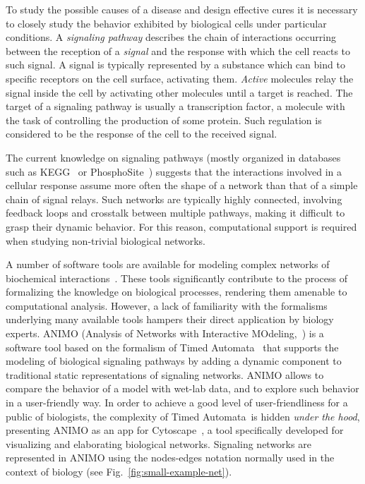 \documentclass{llncs}
\newcommand{\tas}{Timed Automata}
\begin{document}
To study the possible causes of a disease and design effective cures it is 
necessary to closely study the behavior exhibited by biological cells under particular conditions.
A \emph{signaling pathway} describes the chain of interactions occurring
between the reception of a \emph{signal} and the response with which the cell
reacts to such signal. 
A signal is typically represented by a substance which can bind
to specific receptors on the cell surface, activating them.
\emph{Active} molecules relay the signal inside the cell by activating
other molecules until a target is reached. The target of a signaling pathway is usually a transcription
factor, a molecule with the task of controlling the production of some protein. Such regulation is considered to be the response of the cell to the received signal.

The current knowledge on signaling pathways (mostly organized in databases such as KEGG~\cite{kegg}
or PhosphoSite~\cite{phosphosite}) suggests that the interactions involved in a cellular response assume more often
the shape of a network than that of a simple chain of signal relays.
Such networks are typically highly connected, involving feedback loops and crosstalk
between multiple pathways, making it difficult 
to grasp their dynamic behavior.
For this reason, computational support is required when studying non-trivial biological networks.

A number of software tools are available
for modeling complex networks of biochemical interactions~\cite{bio-pepa,blenx,copasi,e-cell,gna}.
These tools significantly contribute to the process of formalizing the knowledge on biological
processes, rendering them amenable to computational analysis.
However, a lack of familiarity with the formalisms underlying many available tools
hampers their direct application by biology experts.
ANIMO (Analysis of Networks with Interactive MOdeling,~\cite{animo-site,animo-ieee,animo-gene}) is a software tool
based on the formalism of \tas~\cite{timed-automata-alur} that supports the
modeling of biological signaling pathways
by adding a dynamic component to traditional static representations of signaling networks.
ANIMO allows to compare the behavior of
a model with wet-lab data, and to explore such behavior in a user-friendly way.
In order to achieve a good level of user-friendliness for a public of biologists, the complexity of \tas\ is hidden \emph{under the hood},
presenting ANIMO as an app for Cytoscape~\cite{cytoscape}, a tool specifically developed for visualizing 
and elaborating biological networks. Signaling networks are represented in ANIMO using
the nodes-edges notation normally used in the context of biology (see Fig.~\ref{fig:small-example-net}).
\end{document}
